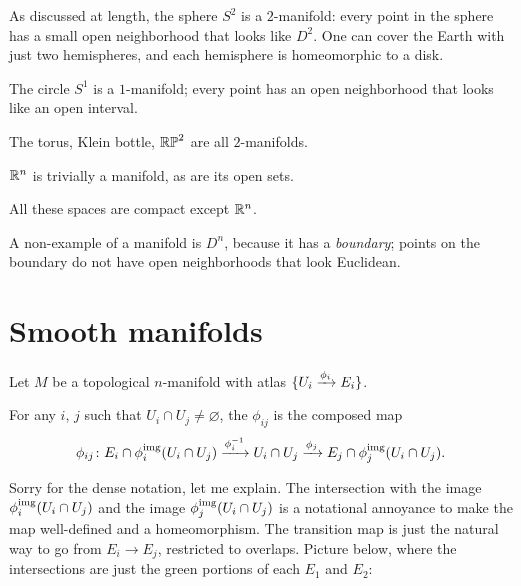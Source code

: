\begin{example}
	\listhack
	\begin{enumerate}[(a)]
		\ii As discussed at length,
		the sphere $S^2$ is a $2$-manifold: every point in the sphere has a
		small open neighborhood that looks like $D^2$.
		One can cover the Earth with just two hemispheres,
		and each hemisphere is homeomorphic to a disk.

		\ii The circle $S^1$ is a $1$-manifold; every point has an
		open neighborhood that looks like an open interval.

		\ii The torus, Klein bottle, $\mathbb{RP}^2$ are all $2$-manifolds.

		\ii $\mathbb R^n$ is trivially a manifold, as are its open sets.
	\end{enumerate}
	All these spaces are compact except $\mathbb R^n$.

	A non-example of a manifold is $D^n$, because it has a \emph{boundary};
	points on the boundary do not have open neighborhoods
	that look Euclidean.
\end{example}

\section{Smooth manifolds}

Let $M$ be a topological $n$-manifold with atlas
$\{U_i \xrightarrow{\phi_i} E_i\}$.
\begin{definition}
	For any $i$, $j$ such that $U_i \cap U_j \neq \varnothing$,
	the  $\phi_{ij}$ is the composed map
	\[
		\phi_{ij} \colon E_i \cap \phi_i^{\text{img}}(U_i \cap U_j)
		\xrightarrow{\phi_i^{-1}}
		U_i \cap U_j
		\xrightarrow{\phi_j} E_j \cap \phi_j^{\text{img}}(U_i \cap U_j).
	\]
\end{definition}
Sorry for the dense notation, let me explain.
The intersection with the image $\phi_i^{\text{img}}(U_i \cap U_j)$
and the image $\phi_j^{\text{img}}(U_i \cap U_j)$ is a notational annoyance
to make the map well-defined and a homeomorphism.
The transition map is just the natural way to go from $E_i \to E_j$,
restricted to overlaps.
Picture below, where the intersections are just the green portions
of each $E_1$ and $E_2$:

